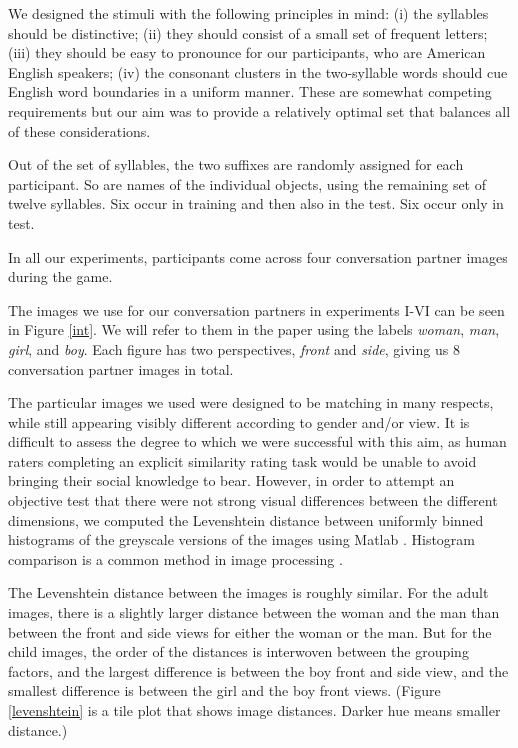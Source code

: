 \documentclass{frontiersSCNS} %
\begin{document}
We designed the stimuli with the following principles in mind: (i) the syllables should be distinctive; (ii) they should consist of a small set of frequent letters; (iii) they should be easy to pronounce for our participants, who are American English speakers; (iv) the consonant clusters in the two-syllable words should cue English word boundaries in a uniform manner. These are somewhat competing requirements  but our aim was to provide a relatively optimal set that balances all of these considerations.

Out of the set of syllables, the two suffixes are randomly assigned for each participant. So are names of the individual objects, using the remaining set of twelve syllables. Six occur in training and then also in the test. Six occur only in test.

In all our experiments, participants come across four conversation partner images during the game.

The images we use for our conversation partners in experiments I-VI can be seen in Figure \ref{int}. We will refer to them in the paper using the labels {\it woman}, {\it man}, {\it girl}, and {\it boy}. Each figure has two perspectives, {\it front} and {\it side}, giving us 8 conversation partner images in total. 

The particular images we used were designed to be matching in many respects, while still appearing visibly different according to gender and/or view. It is difficult to assess the degree to which we were successful with this aim, as human raters completing an explicit similarity rating task would be unable to avoid bringing their social knowledge to bear. However, in order to attempt an objective test that there were not strong visual differences between the different dimensions,  we computed the Levenshtein distance between uniformly binned histograms of the greyscale versions of the images using Matlab \citep{matlab}. Histogram comparison is a common method in image processing \citep{pele2010quadratic}.

The Levenshtein distance between the images is roughly similar. For the adult images, there is a slightly larger distance between the woman and the man than between the front and side views for either the woman or the man.    But for the child images, the order of the distances is interwoven between the grouping factors, and the largest difference is between the boy front and side view, and the smallest difference is between the girl and the boy front views. (Figure \ref{levenshtein} is a tile plot that shows image distances. Darker hue means smaller distance.)
\end{document}
